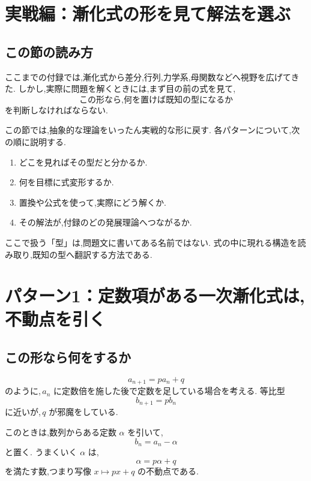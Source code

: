 % 

\section{実戦編：漸化式の形を見て解法を選ぶ}

\subsection*{この節の読み方}

ここまでの付録では,漸化式から差分,行列,力学系,母関数などへ視野を広げてきた.
しかし,実際に問題を解くときには,まず目の前の式を見て,
\[
  \text{この形なら,何を置けば既知の型になるか}
\]
を判断しなければならない.

この節では,抽象的な理論をいったん実戦的な形に戻す.
各パターンについて,次の順に説明する.

\begin{enumerate}
  \item どこを見ればその型だと分かるか.
  \item 何を目標に式変形するか.
  \item 置換や公式を使って,実際にどう解くか.
  \item その解法が,付録のどの発展理論へつながるか.
\end{enumerate}

ここで扱う「型」は,問題文に書いてある名前ではない.
式の中に現れる構造を読み取り,既知の型へ翻訳する方法である.

\section{パターン1：定数項がある一次漸化式は,不動点を引く}

\subsection{この形なら何をするか}

\[
  a_{n+1}=pa_n+q
\]
のように,\,$a_n$ に定数倍を施した後で定数を足している場合を考える.
等比型
\[
  b_{n+1}=pb_n
\]
に近いが,\,$q$ が邪魔をしている.

このときは,数列からある定数 $\alpha$ を引いて,
\[
  b_n=a_n-\alpha
\]
と置く.
うまくいく $\alpha$ は,
\[
  \alpha=p\alpha+q
\]
を満たす数,つまり写像 $x\mapsto px+q$ の不動点である.

